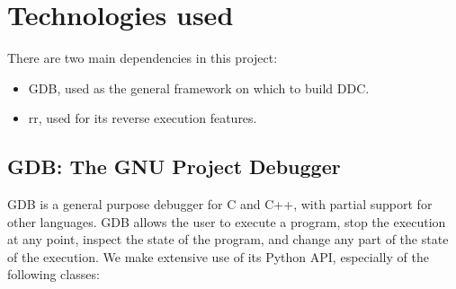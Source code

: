 \section{Technologies used}
There are two main dependencies in this project:
\begin{itemize}
    \item GDB, used as the general framework on which to build DDC.
    \item rr, used for its reverse execution features.
\end{itemize}

\subsection{GDB: The GNU Project Debugger}

GDB \cite{gdb} is a general purpose debugger for C and C++, with partial support for other languages. GDB allows the user to execute a program, stop the execution at any point, inspect the state of the program, and change any part of the state of the execution.
%
We make extensive use of its Python API, especially of the following classes:


